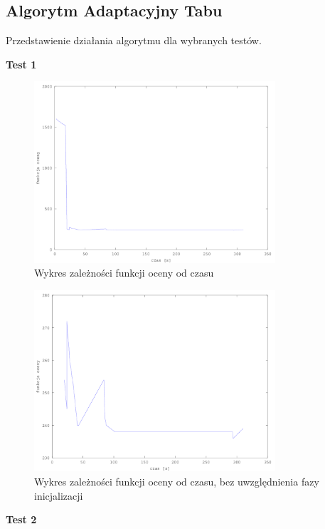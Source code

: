 \subsection{Algorytm Adaptacyjny Tabu}
Przedstawienie działania algorytmu dla wybranych testów.
\par \textbf{Test 1}
\begin{figure}[H]
  \caption{Wykres zależności funkcji oceny od czasu}
  \centering
    \includegraphics[width=0.8\textwidth]{ogolny.png}
\end{figure}
\begin{figure}[H]
  \caption{Wykres zależności funkcji oceny od czasu, bez uwzględnienia fazy inicjalizacji}
  \centering
    \includegraphics[width=0.8\textwidth]{szczeg.png}
\end{figure}
\par \textbf{Test 2}
